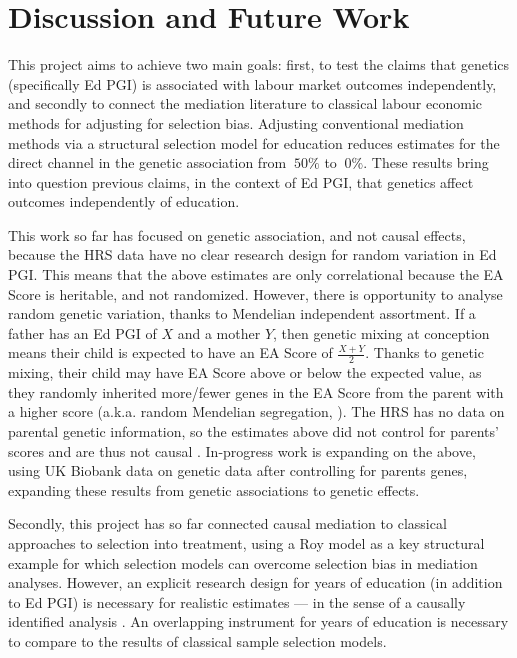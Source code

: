 \section{Discussion and Future Work}
\label{sec:discussion}

This project aims to achieve two main goals:
first, to test the claims that genetics (specifically Ed PGI) is associated with labour market outcomes independently, and secondly to connect the mediation literature to classical labour economic methods for adjusting for selection bias.
Adjusting conventional mediation methods via a structural selection model for education reduces estimates for the direct channel in the genetic association from $~50\%$ to $~0\%$.
These results bring into question previous claims, in the context of Ed PGI, that genetics affect outcomes independently of education.

This work so far has focused on genetic association, and not causal effects, because the HRS data have no clear research design for random variation in Ed PGI.
This means that the above estimates are only correlational because the EA Score is heritable, and not randomized.
However, there is opportunity to analyse random genetic variation, thanks to Mendelian independent assortment.
If a father has an Ed PGI of $X$ and a mother $Y$, then genetic mixing at conception means their child is expected to have an EA Score of $\frac{X+Y}{2}$.
Thanks to genetic mixing, their child may have EA Score above or below the expected value, as they randomly inherited more/fewer genes in the EA Score from the parent with a higher score (a.k.a. random Mendelian segregation, \citealt{young2018relatedness}).
The HRS has no data on parental genetic information, so the estimates above did not control for parents' scores and are thus not causal \citep{young2022mendelian}.
In-progress work is expanding on the above, using UK Biobank data on genetic data after controlling for parents genes, expanding these results from genetic associations to genetic effects.

Secondly, this project has so far connected causal mediation to classical approaches to selection into treatment, using a Roy model as a key structural example for which selection models can overcome selection bias in mediation analyses.
However, an explicit research design for years of education (in addition to Ed PGI) is necessary for realistic estimates --- in the sense of a causally identified analysis \citep{angrist2009mostly}.
An overlapping instrument for years of education is necessary to compare to the results of classical sample selection models.
